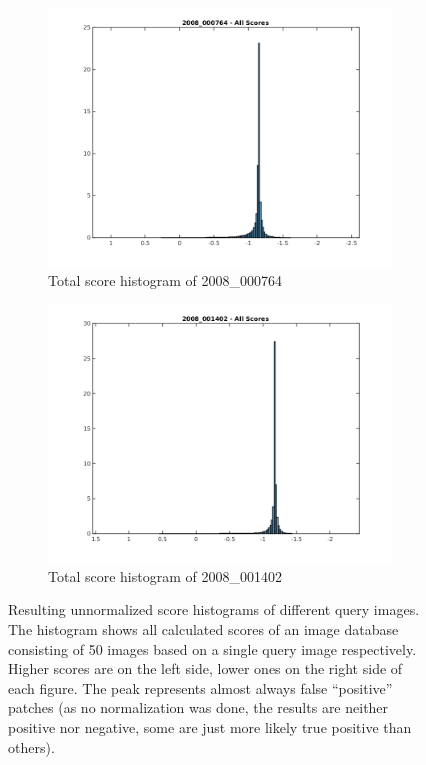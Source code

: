 \begin{figure}
\begin{subfigure}{0.5\textwidth}
\includegraphics[width=\textwidth]{images/2008_000764_all.png}
\caption{Total score histogram of 2008\_000764}
\end{subfigure}%
\begin{subfigure}{0.5\textwidth}
\includegraphics[width=\textwidth]{images/2008_001402_all.png}
\caption{Total score histogram of 2008\_001402}
\end{subfigure}
\caption[Score histograms]{Resulting unnormalized score histograms of different query images. The histogram shows all calculated scores of an image database consisting of 50 images based on a single query image respectively. Higher scores are on the left side, lower ones on the right side of each figure. The peak represents almost always false ``positive'' patches (as no normalization was done, the results are neither positive nor negative, some are just more likely true positive than others).}
\label{fig:score_histograms}
\end{figure}

